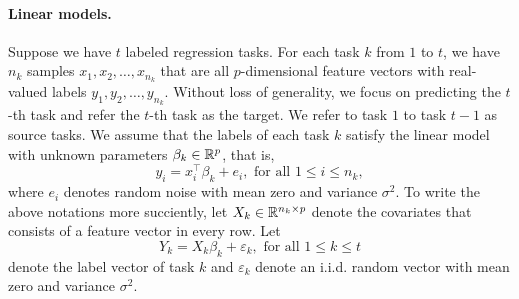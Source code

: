
\paragraph{Linear models.}
Suppose we have $t$ labeled regression tasks. %
For each task $k$ from $1$ to $t$, we have $n_k$ samples $x_1, x_2, \dots, x_{n_k}$ that are all $p$-dimensional feature vectors with real-valued labels $y_1, y_2, \dots, y_{n_k}$.
Without loss of generality, we focus on predicting the $t$-th task and refer the $t$-th task as the target.
We refer to task $1$ to task $t-1$ as source tasks.
We assume that the labels of each task $k$ satisfy the linear model with unknown parameters $\beta_k\in\mathbb{R}^p$, that is,
	\[ y_i = x_i^{\top}\beta_k + e_i, \text{ for all } 1 \le i \le n_k, \]
where $e_i$ denotes random noise with mean zero and variance $\sigma^2$.
To write the above notations more succiently, let $X_k \in \mathbb{R}^{n_k \times p}$ denote the covariates that consists of a feature vector in every row.
Let
	\[ Y_k = X_k \beta_k + \varepsilon_k, \text{ for all } 1\le k \le t \] denote the label vector of task $k$ and $\varepsilon_k$ denote an i.i.d. random vector with mean zero and variance $\sigma^2$.

